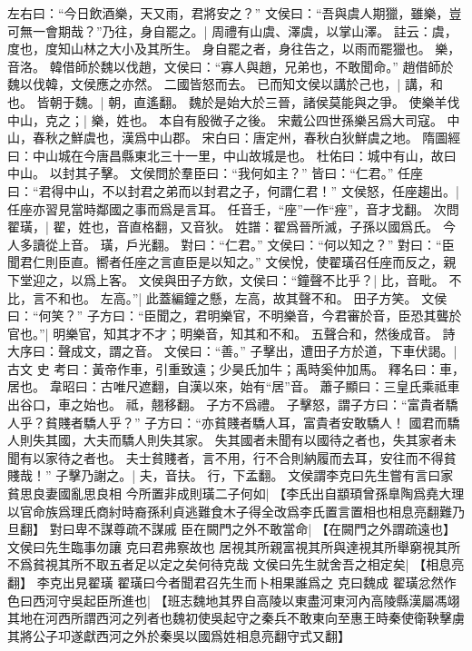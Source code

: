 左右曰：“今日飲酒樂，天又雨，君將安之？”
文侯曰：“吾與虞人期獵，雖樂，豈可無一會期哉？”乃往，身自罷之。|{
	周禮有山虞、澤虞，以掌山澤。
	註云：虞，度也，度知山林之大小及其所生。
	身自罷之者，身往告之，以雨而罷獵也。
	樂，音洛。
	}
韓借師於魏以伐趙，文侯曰：“寡人與趙，兄弟也，不敢聞命。”
趙借師於魏以伐韓，文侯應之亦然。
二國皆怒而去。
已而知文侯以講於己也，|{
	講，和也。
	}
皆朝于魏。|{
	朝，直遙翻。
	}
魏於是始大於三晉，諸侯莫能與之爭。
使樂羊伐中山，克之；|{
	樂，姓也。
	本自有殷微子之後。
	宋戴公四世孫樂呂爲大司寇。
	中山，春秋之鮮虞也，漢爲中山郡。
	宋白曰：唐定州，春秋白狄鮮虞之地。
	隋圖經曰：中山城在今唐昌縣東北三十一里，中山故城是也。
	杜佑曰：城中有山，故曰中山。
	}
以封其子擊。
文侯問於羣臣曰：“我何如主？”
皆曰：“仁君。”
任座曰：“君得中山，不以封君之弟而以封君之子，何謂仁君！”
文侯怒，任座趨出。|{
	任座亦習見當時鄰國之事而爲是言耳。
	任音壬，“座”一作“痤”，音才戈翻。
	}
次問翟璜，|{
	翟，姓也，音直格翻，又音狄。
	姓譜：翟爲晉所滅，子孫以國爲氏。
	今人多讀從上音。
	璜，戶光翻。
	}
對曰：“仁君。”
文侯曰：“何以知之？”
對曰：“臣聞君仁則臣直。嚮者任座之言直臣是以知之。”
文侯悅，使翟璜召任座而反之，親下堂迎之，以爲上客。
文侯與田子方飲，文侯曰：“鐘聲不比乎？|{
	比，音毗。
	不比，言不和也。
	}
左高。”|{
	此蓋編鐘之懸，左高，故其聲不和。
	}
田子方笑。
文侯曰：“何笑？”
子方曰：“臣聞之，君明樂官，不明樂音，今君審於音，臣恐其聾於官也。”|{
	明樂官，知其才不才；明樂音，知其和不和。
	五聲合和，然後成音。
	詩大序曰：聲成文，謂之音。
	}
文侯曰：“善。”
子擊出，遭田子方於道，下車伏謁。|{
	古文 史 考曰：黃帝作車，引重致遠；少昊氏加牛；禹時奚仲加馬。
	釋名曰：車，居也。
	韋昭曰：古唯尺遮翻，自漢以來，始有“居”音。
	蕭子顯曰：三皇氏乘祗車出谷口，車之始也。
	祗，翹移翻。
	}
子方不爲禮。
子擊怒，謂子方曰：“富貴者驕人乎？貧賤者驕人乎？”
子方曰：“亦貧賤者驕人耳，富貴者安敢驕人！
	國君而驕人則失其國，大夫而驕人則失其家。
	失其國者未聞有以國待之者也，失其家者未聞有以家待之者也。
	夫士貧賤者，言不用，行不合則納履而去耳，安往而不得貧賤哉！”
子擊乃謝之。|{
	夫，音扶。
	行，下孟翻。
	}
文侯謂李克曰先生嘗有言曰家貧思良妻國亂思良相
今所置非成則璜二子何如|{
	【李氏出自顓頊曾孫臯陶爲堯大理以官命族爲理氏商紂時裔孫利貞逃難食木子得全改爲李氏置言置相也相息亮翻難乃旦翻】
	}
對曰卑不謀尊疏不謀戚
臣在闕門之外不敢當命|{
	【在闕門之外謂疏遠也】
	}
文侯曰先生臨事勿讓
克曰君弗察故也
居視其所親富視其所與達視其所舉窮視其所不爲貧視其所不取五者足以定之矣何待克哉
文侯曰先生就舍吾之相定矣|{
	【相息亮翻】}
李克出見翟璜
翟璜曰今者聞君召先生而卜相果誰爲之
克曰魏成
翟璜忿然作色曰西河守吳起臣所進也|{
	【班志魏地其界自高陵以東盡河東河內高陵縣漢屬馮翊其地在河西所謂西河之列者也魏初使吳起守之秦兵不敢東向至惠王時秦使衛鞅擊虜其將公子卭遂獻西河之外於秦吳以國爲姓相息亮翻守式又翻】
	}
